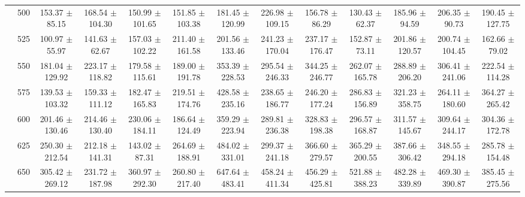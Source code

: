 \begin{table}[h]
{\begin{tabular}{
        ccccccccccccc}
 & 500& 153.37 $\pm$ 85.15& 168.54 $\pm$ 104.30& 150.99 $\pm$ 101.65& 151.85 $\pm$ 103.38& 181.45 $\pm$ 120.99& 226.98 $\pm$ 109.15& 156.78 $\pm$ 86.29& 130.43 $\pm$ 62.37& 185.96 $\pm$ 94.59& 206.35 $\pm$ 90.73& 190.45 $\pm$ 127.75 \\ 
 & 525& 100.97 $\pm$ 55.97& 141.63 $\pm$ 62.67& 157.03 $\pm$ 102.22& 211.40 $\pm$ 161.58& 201.56 $\pm$ 133.46& 241.23 $\pm$ 170.04& 237.17 $\pm$ 176.47& 152.87 $\pm$ 73.11& 201.86 $\pm$ 120.57& 200.74 $\pm$ 104.45& 162.66 $\pm$ 79.02 \\ 
 & 550& 181.04 $\pm$ 129.92& 223.17 $\pm$ 118.82& 179.58 $\pm$ 115.61& 189.00 $\pm$ 191.78& 353.39 $\pm$ 228.53& 295.54 $\pm$ 246.33& 344.25 $\pm$ 246.77& 262.07 $\pm$ 165.78& 288.89 $\pm$ 206.20& 306.41 $\pm$ 241.06& 222.54 $\pm$ 114.28 \\ 
 & 575& 139.53 $\pm$ 103.32& 159.33 $\pm$ 111.12& 182.47 $\pm$ 165.83& 219.51 $\pm$ 174.76& 428.58 $\pm$ 235.16& 238.65 $\pm$ 186.77& 246.20 $\pm$ 177.24& 286.83 $\pm$ 156.89& 321.23 $\pm$ 358.75& 264.11 $\pm$ 180.60& 364.27 $\pm$ 265.42 \\ 
 & 600& 201.46 $\pm$ 130.46& 214.46 $\pm$ 130.40& 230.06 $\pm$ 184.11& 186.64 $\pm$ 124.49& 359.29 $\pm$ 223.94& 289.81 $\pm$ 236.38& 328.83 $\pm$ 198.38& 296.57 $\pm$ 168.87& 311.57 $\pm$ 145.67& 309.64 $\pm$ 244.17& 304.36 $\pm$ 172.78 \\ 
 & 625& 250.30 $\pm$ 212.54& 212.18 $\pm$ 141.31& 143.02 $\pm$ 87.31& 264.69 $\pm$ 188.91& 484.02 $\pm$ 331.01& 299.37 $\pm$ 241.18& 366.60 $\pm$ 279.57& 365.29 $\pm$ 200.55& 387.66 $\pm$ 306.42& 348.55 $\pm$ 294.18& 285.78 $\pm$ 154.48 \\ 
 & 650& 305.42 $\pm$ 269.12& 231.72 $\pm$ 187.98& 360.97 $\pm$ 292.30& 260.80 $\pm$ 217.40& 647.64 $\pm$ 483.41& 458.24 $\pm$ 411.34& 456.29 $\pm$ 425.81& 521.88 $\pm$ 388.23& 482.28 $\pm$ 339.89& 469.30 $\pm$ 390.87& 385.45 $\pm$ 275.56 \\ \hline 

        \end{tabular}%
        }

        \end{table}
        
